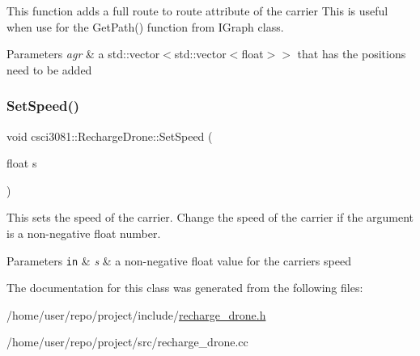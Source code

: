 This function adds a full route to route attribute of the carrier This is useful when use for the Get\+Path() function from I\+Graph class. 


\begin{DoxyParams}{Parameters}
{\em agr} & a std\+::vector$<$std\+::vector$<$float$>$$>$ that has the positions need to be added \\
\hline
\end{DoxyParams}
\mbox{\label{classcsci3081_1_1RechargeDrone_a4cfa100bfeabb0b9c893c74a6aeffc23}} 
\subsubsection{\texorpdfstring{Set\+Speed()}{SetSpeed()}}
{\footnotesize\ttfamily void csci3081\+::\+Recharge\+Drone\+::\+Set\+Speed (\begin{DoxyParamCaption}\item[{float}]{s }\end{DoxyParamCaption})}



This sets the speed of the carrier. Change the speed of the carrier if the argument is a non-\/negative float number. 


\begin{DoxyParams}[1]{Parameters}
\mbox{\tt in}  & {\em s} & a non-\/negative float value for the carrier\textquotesingle{}s speed \\
\hline
\end{DoxyParams}


The documentation for this class was generated from the following files\+:\begin{DoxyCompactItemize}
\item 
/home/user/repo/project/include/\hyperlink{recharge__drone_8h}{recharge\+\_\+drone.\+h}\item 
/home/user/repo/project/src/recharge\+\_\+drone.\+cc\end{DoxyCompactItemize}
